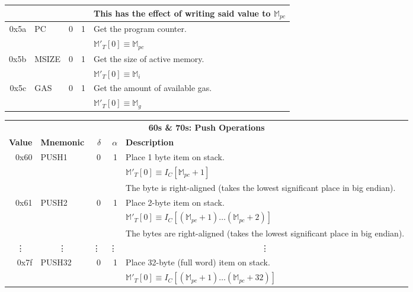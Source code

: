 \documentclass[9pt,oneside]{amsart}
\begin{document}
\begin{tabular*}{\columnwidth}[h]{rlrrl}
&&&& This has the effect of writing said value to $\mathbb{M}_{pc}$ \\
\midrule
0x5a & {\small PC} & 0 & 1 & Get the program counter. \\
&&&& $\mathbb{M}'_T[0] \equiv \mathbb{M}_{pc}$ \\
\midrule
0x5b & {\small MSIZE} & 0 & 1 & Get the size of active memory. \\
&&&& $\mathbb{M}'_T[0] \equiv \mathbb{M}_{i}$ \\
\midrule
0x5c & {\small GAS} & 0 & 1 & Get the amount of available gas. \\
&&&& $\mathbb{M}'_T[0] \equiv \mathbb{M}_{g}$ \\
\bottomrule
\end{tabular*}

\begin{tabular*}{\columnwidth}[h]{rlrrl}
\toprule
\multicolumn{5}{c}{\textbf{60s \& 70s: Push Operations}} \vspace{5pt} \\
\textbf{Value} & \textbf{Mnemonic} & $\delta$ & $\alpha$ & \textbf{Description} \vspace{5pt} \\
0x60 & {\small PUSH1} & 0 & 1 & Place 1 byte item on stack. \\
&&&& $\mathbb{M}'_T[0] \equiv I_C[\mathbb{M}_{pc} + 1]$ \\
&&&& The byte is right-aligned (takes the lowest significant place in big endian). \\
\midrule
0x61 & {\small PUSH2} & 0 & 1 & Place 2-byte item on stack. \\
&&&& $\mathbb{M}'_T[0] \equiv I_C[(\mathbb{M}_{pc} + 1) \dots (\mathbb{M}_{pc} + 2) ]$ \\
&&&& The bytes are right-aligned (takes the lowest significant place in big endian). \\
\midrule
\multicolumn{1}{c}{\vdots} & \multicolumn{1}{c}{\vdots} & \vdots & \vdots & \multicolumn{1}{c}{\vdots} \\
\midrule
0x7f & {\small PUSH32} & 0 & 1 & Place 32-byte (full word) item on stack. \\
&&&& $\mathbb{M}'_T[0] \equiv I_C[(\mathbb{M}_{pc} + 1) \dots (\mathbb{M}_{pc} + 32) ]$ \\
\bottomrule
\end{tabular*}
\end{document}
